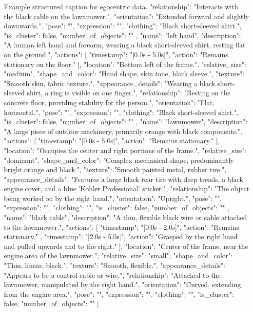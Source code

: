 \begin{captionexample}{Example structured caption for egocentric data.}
{{      "relationship": "Interacts with the black cable on the lawnmower.",
      "orientation": "Extended forward and slightly downwards.",
      "pose": "",
      "expression": "",
      "clothing": "Black short-sleeved shirt.",
      "is_cluster": false,
      "number_of_objects": ""
    },
    {
      "name": "left hand",
      "description": "A human left hand and forearm, wearing a black short-sleeved shirt, resting flat on the ground.",
      "actions": [
        {
          "timestamp": "[0.0s - 5.0s]",
          "action": "Remains stationary on the floor."
        }
      ],
      "location": "Bottom left of the frame.",
      "relative_size": "medium",
      "shape_and_color": "Hand shape, skin tone, black sleeve.",
      "texture": "Smooth skin, fabric texture.",
      "appearance_details": "Wearing a black short-sleeved shirt, a ring is visible on one finger.",
      "relationship": "Resting on the concrete floor, providing stability for the person.",
      "orientation": "Flat, horizontal.",
      "pose": "",
      "expression": "",
      "clothing": "Black short-sleeved shirt.",
      "is_cluster": false,
      "number_of_objects": ""
    },
    {
      "name": "lawnmower",
      "description": "A large piece of outdoor machinery, primarily orange with black components.",
      "actions": [
        {
          "timestamp": "[0.0s - 5.0s]",
          "action": "Remains stationary."
        }
      ],
      "location": "Occupies the center and right portions of the frame.",
      "relative_size": "dominant",
      "shape_and_color": "Complex mechanical shape, predominantly bright orange and black.",
      "texture": "Smooth painted metal, rubber tire.",
      "appearance_details": "Features a large black rear tire with deep treads, a black engine cover, and a blue 'Kohler Professional' sticker.",
      "relationship": "The object being worked on by the right hand.",
      "orientation": "Upright.",
      "pose": "",
      "expression": "",
      "clothing": "",
      "is_cluster": false,
      "number_of_objects": ""
    },
    {
      "name": "black cable",
      "description": "A thin, flexible black wire or cable attached to the lawnmower.",
      "actions": [
        {
          "timestamp": "[0.0s - 2.0s]",
          "action": "Remains stationary."
        },
        {
          "timestamp": "[2.0s - 5.0s]",
          "action": "Grasped by the right hand and pulled upwards and to the right."
        }
      ],
      "location": "Center of the frame, near the engine area of the lawnmower.",
      "relative_size": "small",
      "shape_and_color": "Thin, linear, black.",
      "texture": "Smooth, flexible.",
      "appearance_details": "Appears to be a control cable or wire.",
      "relationship": "Attached to the lawnmower, manipulated by the right hand.",
      "orientation": "Curved, extending from the engine area.",
      "pose": "",
      "expression": "",
      "clothing": "",
      "is_cluster": false,
      "number_of_objects": ""
    }
  ]
}
\end{captionexample}
